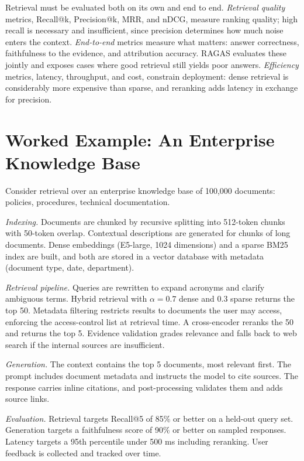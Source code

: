 \documentclass[11pt]{book}
\begin{document}
Retrieval must be evaluated both on its own and end to end. \textit{Retrieval quality} metrics, Recall@k, Precision@k, MRR, and nDCG, measure ranking quality; high recall is necessary and insufficient, since precision determines how much noise enters the context. \textit{End-to-end} metrics measure what matters: answer correctness, faithfulness to the evidence, and attribution accuracy. RAGAS \cite{ragas} evaluates these jointly and exposes cases where good retrieval still yields poor answers. \textit{Efficiency} metrics, latency, throughput, and cost, constrain deployment: dense retrieval is considerably more expensive than sparse, and reranking adds latency in exchange for precision.

\section{Worked Example: An Enterprise Knowledge Base}

Consider retrieval over an enterprise knowledge base of 100{,}000 documents: policies, procedures, technical documentation.

\textit{Indexing.} Documents are chunked by recursive splitting into 512-token chunks with 50-token overlap. Contextual descriptions are generated for chunks of long documents. Dense embeddings (E5-large, 1024 dimensions) and a sparse BM25 index are built, and both are stored in a vector database with metadata (document type, date, department).

\textit{Retrieval pipeline.} Queries are rewritten to expand acronyms and clarify ambiguous terms. Hybrid retrieval with $\alpha = 0.7$ dense and $0.3$ sparse returns the top 50. Metadata filtering restricts results to documents the user may access, enforcing the access-control list at retrieval time. A cross-encoder reranks the 50 and returns the top 5. Evidence validation grades relevance and falls back to web search if the internal sources are insufficient.

\textit{Generation.} The context contains the top 5 documents, most relevant first. The prompt includes document metadata and instructs the model to cite sources. The response carries inline citations, and post-processing validates them and adds source links.

\textit{Evaluation.} Retrieval targets Recall@5 of 85\% or better on a held-out query set. Generation targets a faithfulness score of 90\% or better on sampled responses. Latency targets a 95th percentile under 500 ms including reranking. User feedback is collected and tracked over time.
\end{document}
